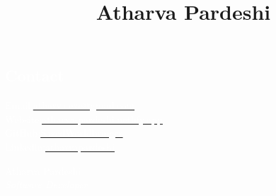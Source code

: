 \documentclass[11pt, oneside, a4paper, titlepage]{article}
\title{Atharva Pardeshi}
\date{}
\begin{document}
\begin{tcolorbox}
  \begin{minipage}{4.5cm}
    \vspace{0.5cm}
    \subsection{\textcolor{white}{Contact}}
    \textcolor{white}{Email:}\href{mailto:atharva.exe@gmail.com}{\underline{\textcolor{white}{atharva.exe@gmail.com}}} \\
    \textcolor{white}{Website:}\href{https://atharva-pardeshi.netlify.app}{\underline{\textcolor{white}{atharva-pardeshi.netlify.app}}} \\
    \textcolor{white}{GitHub:}\href{https://github.com/SazedWorldbringer}{\underline{\textcolor{white}{SazedWorldbringer}}} \\
    \textcolor{white}{Linkedin:}\href{https://linkedin.com/in/atharvapardeshi}{\underline{\textcolor{white}{atharvapardeshi}}} \\
  \end{minipage}
  \begin{minipage}{15cm}
    \begin{center}
      \Huge{\textcolor{white}{Atharva Pardeshi}} \\
      \vspace*{0.5cm}
      \Large{\textcolor{white}{\textit{Software Developer}}}
    \end{center}
  \end{minipage}
\end{tcolorbox}
\end{document}

